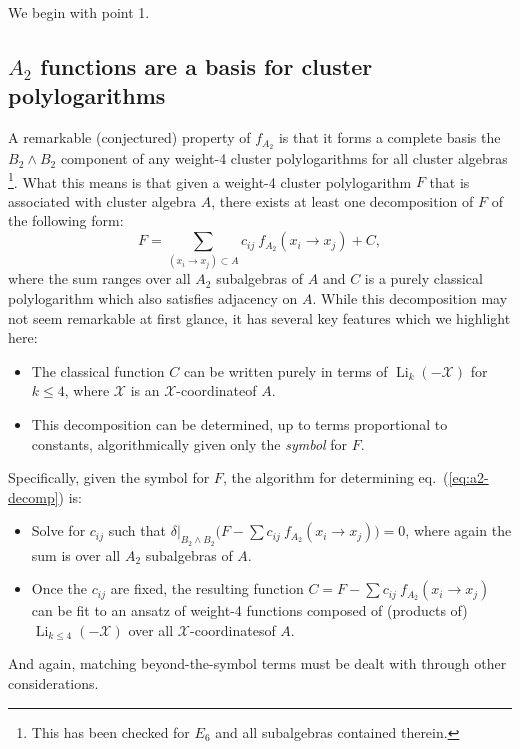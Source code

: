 \documentclass[11pt]{article}
\DeclareMathOperator{\Li}{Li}
\def\x{\mathcal{X}}
\def\xcoord{$\mathcal{X}$-coordinate}
\def\xcoords{$\mathcal{X}$-coordinates}
\def\pdfeq#1{\texorpdfstring{$#1$}{a}}
\begin{document}
We begin with point 1. 

\subsection{\pdfeq{A_2} functions are a basis for cluster polylogarithms}

A remarkable (conjectured) property of $f_{A_2}$ is that it forms a complete basis the $B_2 \wedge B_2$ component of any weight-4 cluster polylogarithms for all cluster algebras \footnote{This has been checked for $E_6$ and all subalgebras contained therein.}. What this means is that given a weight-4 cluster polylogarithm $F$ that is associated with cluster algebra $A$, there exists at least one decomposition of $F$ of the following form:
\begin{equation}\label{eq:a2-decomp}
	F = \sum_{(x_i\to x_j) \subset A} c_{ij} ~f_{A_2}(x_i \to x_j) + C, 
\end{equation}
where the sum ranges over all $A_2$ subalgebras of $A$ and $C$ is a purely classical polylogarithm which also satisfies adjacency on $A$. While this decomposition may not seem remarkable at first glance, it has several key features which we highlight here:
\begin{itemize}
	\item The classical function $C$ can be written purely in terms of $\Li_{k}(-\x)$ for $k\le4$, where $\x$ is an \xcoord of $A$.
	\item This decomposition can be determined, up to terms proportional to constants, algorithmically given only the \emph{symbol} for $F$.
\end{itemize}
Specifically, given the symbol for $F$, the algorithm for determining eq.~(\ref{eq:a2-decomp}) is: 
\begin{itemize}
	\item Solve for $c_{ij}$ such that $\delta|_{B_2 \wedge B_2}\big(F - \sum c_{ij} ~f_{A_2}(x_i \to x_j)\big) = 0$, where again the sum is over all $A_2$ subalgebras of $A$.
	\item Once the $c_{ij}$ are fixed, the resulting function $C = F - \sum c_{ij} ~f_{A_2}(x_i \to x_j)$ can be fit to an ansatz of weight-4 functions composed of (products of) $\Li_{k\le4}(-\x)$ over all \xcoords of $A$. 
\end{itemize}
And again, matching beyond-the-symbol terms must be dealt with through other considerations. 
\end{document}
